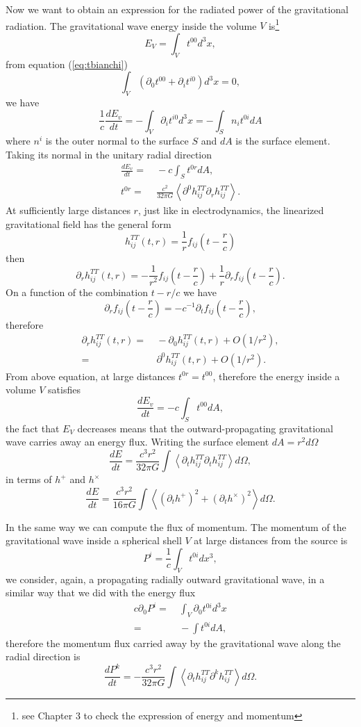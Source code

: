 Now we want to obtain an expression for the radiated power of the
gravitational radiation. The gravitational wave energy inside the
volume $V$ is\footnote{see Chapter 3 to check the expression of energy and momentum}
\[
E_{V}=\int_{V}t^{00}d^{3}x,
\]
from equation (\ref{eq:tbianchi})
\[
\int_{V}\left(\partial_{0}t^{00}+\partial_{i}t^{i0}\right)d^{3}x=0,
\]
we have
\[
\frac{1}{c}\frac{dE_{v}}{dt}=-\int_{V}\partial_{i}t^{i0}d^{3}x=-\int_{S}n_{i}t^{0i}dA
\]
where $n^{i}$ is the outer normal to the surface $S$ and $dA$ is
the surface element. Taking its normal in the unitary radial direction
\begin{align*}
\frac{dE_{v}}{dt}= & \ -c\int_{S}t^{0r}dA,\\
t^{0r}= & \ \frac{c^{2}}{32\pi G}\left\langle \partial^{0}h_{ij}^{TT}\partial_{r}h_{ij}^{TT}\right\rangle .
\end{align*}
At sufficiently large distances $r$, just like in electrodynamics,
the linearized gravitational field has the general form
\[
h_{ij}^{TT}\left(t,r\right)=\frac{1}{r}f_{ij}\left(t-\frac{r}{c}\right)
\]
then
\[
\partial_{r}h_{ij}^{TT}\left(t,r\right)=-\frac{1}{r^{2}}f_{ij}\left(t-\frac{r}{c}\right)+\frac{1}{r}\partial_{r}f_{ij}\left(t-\frac{r}{c}\right).
\]
On a function of the combination $t-r/c$ we have
\[
\partial_{r}f_{ij}\left(t-\frac{r}{c}\right)=-c^{-1}\partial_{t}f_{ij}\left(t-\frac{r}{c}\right),
\]
therefore
\begin{align*}
\partial_{r}h_{ij}^{TT}\left(t,r\right)= & \ -\partial_{0}h_{ij}^{TT}\left(t,r\right)+O\left(1/r^{2}\right),\\
= & \ \partial^{0}h_{ij}^{TT}\left(t,r\right)+O\left(1/r^{2}\right).
\end{align*}
From above equation, at large distances $t^{0r}=t^{00}$, therefore
the energy inside a volume $V$ satisfies
\[
\frac{dE_{v}}{dt}=-c\int_{S}t^{00}dA,
\]
the fact that $E_{V}$ decreases means that the outward-propagating
gravitational wave carries away an energy flux. Writing the surface
element $dA=r^{2}d\Omega$
\[
\frac{dE}{dt}=\frac{c^{3}r^{2}}{32\pi G}\int\left\langle \partial_{t}h_{ij}^{TT}\partial_{t}h_{ij}^{TT}\right\rangle d\Omega,
\]
in terms of $h^{+}$ and $h^{\times}$
\begin{equation}
\label{eq:dedt-ch2}
\frac{dE}{dt}=\frac{c^{3}r^{2}}{16\pi G}\int\left\langle \left(\partial_{t}h^{+}\right)^{2}+\left(\partial_{t}h^{\times}\right)^{2}\right\rangle d\Omega.
\end{equation}

In the same way we can compute the flux of momentum. The momentum
of the gravitational wave inside a spherical shell $V$ at large
distances from the source is
\[
P^{i}=\frac{1}{c}\int_{V}t^{0i}dx^{3},
\]
we consider, again, a propagating radially outward gravitational wave,
in a similar way that we did with the energy flux
\begin{align*}
c\partial_{0}P^{i}= & \ \int_{V}\partial_{0}t^{0i}d^{3}x\\
= & \ -\int t^{0i}dA,
\end{align*}
therefore the momentum flux carried away by the gravitational wave
along the radial direction is
\[
\frac{dP^{k}}{dt}=-\frac{c^{3}r^{2}}{32\pi G}\int\left\langle \partial_{t}h_{ij}^{TT}\partial^{k}h_{ij}^{TT}\right\rangle d\Omega.
\]

